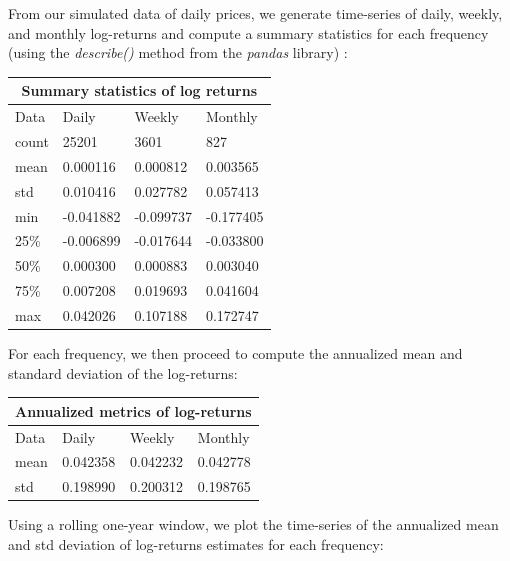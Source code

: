\documentclass[10pt]{article}
\newenvironment{exercise}[2][Exercise]{\begin{trivlist}
  \item[\hskip \labelsep {\bfseries #1}\hskip \labelsep {\bfseries #2.}]}{\end{trivlist}}
\begin{document}
	\newpage  
  
  \begin{exercise}{3}
 	 
	From our simulated data of daily prices, we generate time-series of daily, weekly, and monthly log-returns and compute a summary statistics for each frequency (using the \textit{describe()} method from the \textit{pandas} library) :
	
	\bigbreak
	
	\begin{tabular}{ |p{3cm}||p{3cm}|p{3cm}|p{3cm}|  }
 		\hline
		\multicolumn{4}{|c|}{Summary statistics of log returns} \\
		\hline
		Data & Daily & Weekly & Monthly\\
 		\hline
 		count   &  25201 & 3601 & 827\\
 		mean & 0.000116 & 0.000812 & 0.003565\\
 		std & 0.010416 & 0.027782 & 0.057413\\
 		min & -0.041882 & -0.099737 & -0.177405\\
 		25\% &  -0.006899 & -0.017644 & -0.033800\\
 		50\% & 0.000300 & 0.000883 & 0.003040\\
 		75\% & 0.007208 & 0.019693 & 0.041604\\
 		max & 0.042026 & 0.107188 & 0.172747\\
 		\hline
	\end{tabular}

	\bigbreak	
	
	For each frequency, we then proceed to compute the annualized mean and standard deviation of the log-returns: 
	
	\bigbreak
	
	\begin{tabular}{ |p{3cm}||p{3cm}|p{3cm}|p{3cm}|  }
		\hline
	 	\multicolumn{4}{|c|}{Annualized metrics of log-returns} \\
	 	\hline
	 	Data & Daily & Weekly & Monthly\\
 		\hline
 		mean  &  0.042358 & 0.042232 & 0.042778\\
 		std & 0.198990 & 0.200312 & 0.198765\\
 		\hline
	\end{tabular}
	
	\bigbreak	
	
	Using a rolling one-year window, we plot the time-series of the annualized mean and std deviation of log-returns estimates for each frequency:
	

\end{exercise}
\end{document}
